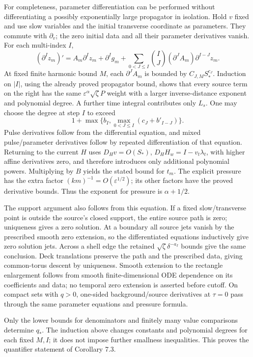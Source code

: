 \documentclass[10pt,a4paper]{article}
\begin{document}
For completeness, parameter differentiation can be performed without differentiating a possibly exponentially large propagator in isolation. Hold \(v\) fixed and use slow variables and the initial transverse coordinate as parameters. They commute with \(\partial_v\); the zero initial data and all their parameter derivatives vanish. For each multi-index \(I\), \[
(\partial^Iz_m)'=A_m\partial^Iz_m+\partial^Ig_m+
\sum_{0<J\le I}\binom IJ(\partial^JA_m)\partial^{I-J}z_m.
\] At fixed finite harmonic bound \(M\), each \(\partial^JA_m\) is bounded by \(C_{J,M}S_*^{c_J}\). Induction on \(|I|\), using the already proved propagator bound, shows that every source term on the right has the same \(\varepsilon^\alpha\sqrt\zeta P\) weight with a larger inverse-distance exponent and polynomial degree. A further time integral contributes only \(L_s\). One may choose the degree at step \(I\) to exceed \[
1+\max\{b_I,\max_{0<J\le I}(c_J+b'_{I-J})\}.
\] Pulse derivatives follow from the differential equation, and mixed pulse/parameter derivatives follow by repeated differentiation of that equation. Returning to the current \(H\) uses \(D_Hv=O(S_*)\), \(D_HH_w=I-v_t\lambda_t\), with higher affine derivatives zero, and therefore introduces only additional polynomial powers. Multiplying by \(B\) yields the stated bound for \(t_m\). The explicit pressure has the extra factor \((km)^{-1}=O(\varepsilon^{1/2})\); its other factors have the proved derivative bounds. Thus the exponent for pressure is \(\alpha+1/2\).

The support argument also follows from this equation. If a fixed slow/transverse point is outside the source's closed support, the entire source path is zero; uniqueness gives a zero solution. At a boundary all source jets vanish by the prescribed smooth zero extension, so the differentiated equations inductively give zero solution jets. Across a shell edge the retained \(\sqrt\zeta\delta^{-a_I}\) bounds give the same conclusion. Deck translations preserve the path and the prescribed data, giving common-torus descent by uniqueness. Smooth extension to the rectangle enlargement follows from smooth finite-dimensional ODE dependence on its coefficients and data; no temporal zero extension is asserted before cutoff. On compact sets with \(q>0\), one-sided background/source derivatives at \(\tau=0\) pass through the same parameter equations and pressure formula.

Only the lower bounds for denominators and finitely many value comparisons determine \(q_*\). The induction above changes constants and polynomial degrees for each fixed \(M,I\); it does not impose further smallness inequalities. This proves the quantifier statement of Corollary 7.3.
\end{document}
